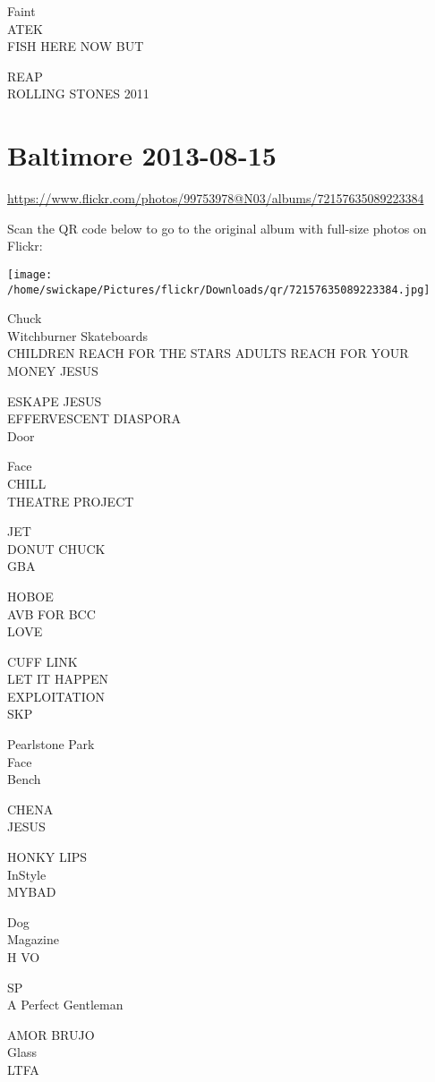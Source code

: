 \documentclass[10pt,letterpaper]{article}
\begin{document}
Faint\\
ATEK\\
FISH HERE NOW BUT

REAP\\
ROLLING STONES 2011


\section*{Baltimore 2013-08-15}

\url{https://www.flickr.com/photos/99753978@N03/albums/72157635089223384}

Scan the QR code below to go to the original album with full-size photos on Flickr:

\texttt{[image: /home/swickape/Pictures/flickr/Downloads/qr/72157635089223384.jpg]}


Chuck\\
Witchburner Skateboards\\
CHILDREN REACH FOR THE STARS ADULTS REACH FOR YOUR MONEY JESUS

ESKAPE JESUS\\
EFFERVESCENT DIASPORA\\
Door

Face\\
CHILL\\
THEATRE PROJECT

JET\\
DONUT CHUCK\\
GBA

HOBOE\\
AVB FOR BCC\\
LOVE

CUFF LINK\\
LET IT HAPPEN\\
EXPLOITATION\\
SKP

Pearlstone Park\\
Face\\
Bench

CHENA\\
JESUS

HONKY LIPS\\
InStyle\\
MYBAD

Dog\\
Magazine\\
H VO

SP\\
A Perfect Gentleman

AMOR BRUJO\\
Glass\\
LTFA
\end{document}
